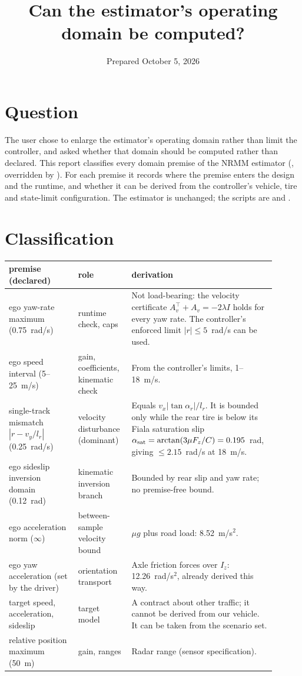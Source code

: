 \documentclass[11pt]{article}
\title{Can the estimator's operating domain be computed?}
\date{Prepared October 5, 2026}
\begin{document}
\maketitle

\section{Question}
The user chose to enlarge the estimator's operating domain rather than limit
the controller, and asked whether that domain should be computed rather than
declared. This report classifies every domain premise of the NRMM estimator
(, overridden by
). For each premise it
records where the premise enters the design and the runtime, and whether it can
be derived from the controller's vehicle, tire and state-limit configuration.
The estimator is unchanged; the scripts are 
and .

\section{Classification}
\begin{center}
\begin{tabular}{p{0.24\linewidth}p{0.16\linewidth}p{0.5\linewidth}}
\toprule
premise (declared) & role & derivation\\
\midrule
ego yaw-rate maximum (0.75~rad/s) & runtime check, caps & Not load-bearing: the velocity certificate $A_v^\top+A_v=-2\lambda I$ holds for every yaw rate. The controller's enforced limit $|r|\le5$~rad/s can be used.\\
ego speed interval (5--25~m/s) & gain, coefficients, kinematic check & From the controller's limits, 1--18~m/s.\\
single-track mismatch $|r-v_y/l_r|$ (0.25~rad/s) & velocity disturbance (dominant) & Equals $v_x|\tan\alpha_r|/l_r$. It is bounded only while the rear tire is below its Fiala saturation slip $\alpha_{\rm sat}=\arctan(3\mu F_z/C)=0.195$~rad, giving $\le2.15$~rad/s at 18~m/s.\\
ego sideslip inversion domain (0.12~rad) & kinematic inversion branch & Bounded by rear slip and yaw rate; no premise-free bound.\\
ego acceleration norm ($\infty$) & between-sample velocity bound & $\mu g$ plus road load: 8.52~m/s$^2$.\\
ego yaw acceleration (set by the driver) & orientation transport & Axle friction forces over $I_z$: 12.26~rad/s$^2$, already derived this way.\\
target speed, acceleration, sideslip & target model & A contract about other traffic; it cannot be derived from our vehicle. It can be taken from the scenario set.\\
relative position maximum (50~m) & gain, ranges & Radar range (sensor specification).\\
\bottomrule
\end{tabular}
\end{center}
\end{document}
